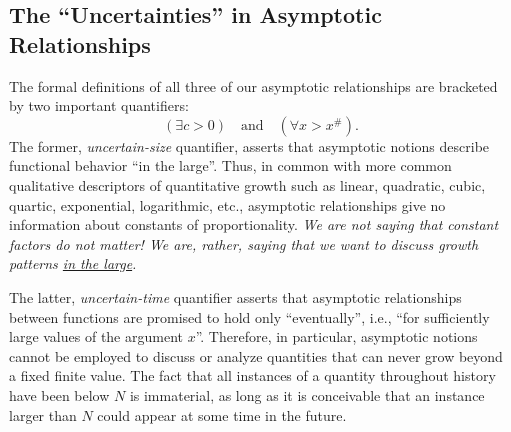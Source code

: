 
\subsection{The ``Uncertainties'' in Asymptotic Relationships}
\label{sec:uncertainties-asymptotics}

The formal definitions of all three of our asymptotic relationships
are bracketed by two important quantifiers:
\[ 
(\exists c >0) \ \ \ \mbox{ and }  \ \ \  (\forall x > x^{\#}).
\]
The former, {\em uncertain-size} quantifier, asserts that asymptotic
notions describe functional behavior ``in the large''.  Thus, in
common with more common qualitative descriptors of quantitative growth
such as linear, quadratic, cubic, quartic, exponential, logarithmic,
etc., asymptotic relationships give no information about constants of
proportionality.  {\em We are not saying that constant factors do not
  matter!  We are, rather, saying that we want to discuss growth
  patterns \underline{in the large}.}

The latter, {\em uncertain-time} quantifier asserts that asymptotic
relationships between functions are promised to hold only
``eventually'', i.e., ``for sufficiently large values of the argument
$x$''.  Therefore, in particular, asymptotic notions cannot be
employed to discuss or analyze quantities that can never grow beyond a
fixed finite value.  The fact that all instances of a quantity
throughout history have been below $N$ is immaterial, as long as it is
conceivable that an instance larger than $N$ could appear at some time
in the future.

